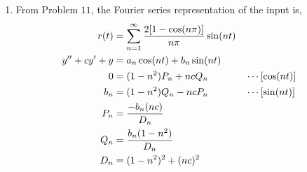 \begin{enumerate}
    \item From Problem $ 11 $, the Fourier series representation of the input is,
          \begin{align}
              r(t)          & = \iser[n]{1} \frac{2 [1 - \cos(n\pi)]}{n\pi} \sin(nt)   \\
              y'' + cy' + y & = a_n \cos(nt) + b_n \sin(nt)                            \\
              0             & = (1 - n^2)P_n + nc Q_n                                &
                            & \cdots[\cos(nt)]                                         \\
              b_n           & = (1 - n^2)Q_n - nc P_n                                &
                            & \cdots[\sin(nt)]                                         \\
              P_n           & = \frac{- b_n (nc)}{D_n}                                 \\
              Q_n           & = \frac{b_n (1 - n^2)}{D_n}                              \\
              D_n           & = (1 - n^2)^2 + (nc)^2
          \end{align}
          \begin{figure}[H]
              \centering
          \end{figure}


\end{enumerate}

